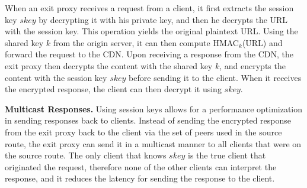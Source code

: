 When an exit proxy receives a request from a client, it first extracts the session
key $skey$ by decrypting it with 
his private key, and then he decrypts the URL with the session key.  This operation
yields the original plaintext
URL. Using the shared key $k$ from the origin server, it can then compute
HMAC$_k$(URL) and forward the request 
to the CDN.  Upon receiving a response from the CDN, the exit proxy then decrypts
the content with the shared key $k$, and
encrypts the content with the session key $skey$ before sending it to the client.
When it receives the encrypted response, 
the client can then decrypt it using $skey$.

\textbf{Multicast Responses.}
Using session keys allows for a performance optimization in sending responses back to clients.  Instead of sending 
the encrypted response from the exit proxy back to the client via the set of peers used in the source route, the exit 
proxy can send it in a multicast manner to all clients that were on the source route.  The only client that knows $skey$ 
is the true client that originated the request, therefore none of the other clients can interpret the response, and it reduces the 
latency for sending the response to the client.  


